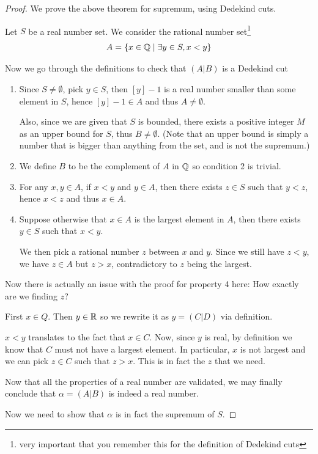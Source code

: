 \begin{proof}
We prove the above theorem for supremum, using Dedekind cuts.

Let $S$ be a real number set. We consider the rational number set\footnote{very important that you remember this for the definition of Dedekind cuts}
\[ A = \{x \in \mathbb Q \mid \exists y \in S, x<y\} \]

Now we go through the definitions to check that $(A|B)$ is a Dedekind cut
\begin{enumerate}
\item Since $S\neq\emptyset$, pick $y\in S$, then $[y]-1$ is a real number smaller than some element in $S$, hence $[y]-1 \in A$ and thus $A\neq\emptyset$.

Also, since we are given that $S$ is bounded, there exists a positive integer $M$ as an upper bound for $S$, thus $B\neq\emptyset$. (Note that an upper bound is simply a number that is bigger than anything from the set, and is not the supremum.)

\item We define $B$ to be the complement of $A$ in $\mathbb Q$ so condition 2 is trivial.

\item For any $x,y\in A$, if $x<y$ and $y\in A$, then there exists $z\in S$ such that $y<z$, hence $x<z$ and thus $x\in A$.

\item Suppose otherwise that $x\in A$ is the largest element in $A$, then there exists $y\in S$ such that $x<y$.

We then pick a rational number $z$ between $x$ and $y$. Since we still have $z<y$, we have $z\in A$ but $z>x$, contradictory to $z$ being the largest.
\end{enumerate}

Now there is actually an issue with the proof for property 4 here: How exactly are we finding $z$?

First $x\in Q$. Then $y\in\mathbb R$ so we rewrite it as $y=(C|D)$ via definition.

$x<y$ translates to the fact that $x\in C$. Now, since $y$ is real, by definition we know that $C$ must not have a largest element. In particular, $x$ is not largest and we can pick $z\in C$ such that $z>x$. This is in fact the $z$ that we need.

Now that all the properties of a real number are validated, we may finally conclude that $\alpha=(A|B)$ is indeed a real number.


Now we need to show that $\alpha$ is in fact the supremum of $S$.


\end{proof}
